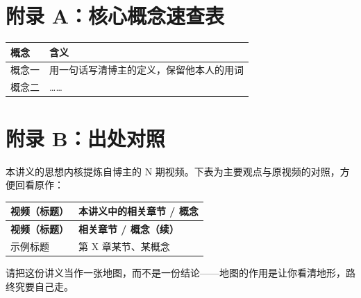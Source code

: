 \appendix

\section*{附录 A：核心概念速查表}

\begin{center}
\small
\begin{tabular}{>{\raggedright\arraybackslash}p{3.2cm} p{12.0cm}}
\toprule
\textbf{概念} & \textbf{含义} \\
\midrule
概念一 & 用一句话写清博主的定义，保留他本人的用词 \\
概念二 & …… \\
\bottomrule
\end{tabular}
\end{center}

\clearpage
\section*{附录 B：出处对照}

本讲义的思想内核提炼自博主的 N 期视频。下表为主要观点与原视频的对照，方便回看原作：

\begin{small}
\begin{longtable}{>{\raggedright\arraybackslash}p{5.2cm} >{\raggedright\arraybackslash}p{10.0cm}}
\toprule
\textbf{视频（标题）} & \textbf{本讲义中的相关章节 / 概念} \\
\midrule
\endfirsthead
\toprule
\textbf{视频（标题）} & \textbf{相关章节 / 概念（续）} \\
\midrule
\endhead
\bottomrule
\endfoot
示例标题 & 第 X 章某节、某概念 \\
\end{longtable}
\end{small}

\vspace{1em}

 请把这份讲义当作一张地图，而不是一份结论——地图的作用是让你看清地形，路终究要自己走。
